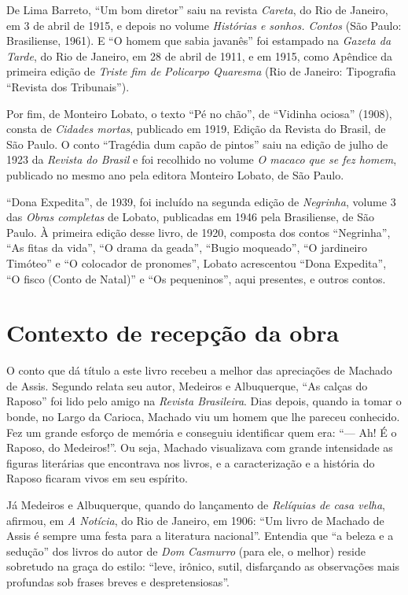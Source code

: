 De Lima Barreto, ``Um bom diretor'' saiu na revista \emph{Careta}, do
Rio de Janeiro, em 3 de abril de 1915, e depois no volume
\emph{Histórias e sonhos. Contos} (São Paulo: Brasiliense, 1961). E ``O
homem que sabia javanês'' foi estampado na \emph{Gazeta da Tarde}, do
Rio de Janeiro, em 28 de abril de 1911, e em 1915, como Apêndice da
primeira edição de \emph{Triste fim de} \emph{Policarpo Quaresma} (Rio
de Janeiro: Tipografia ``Revista dos Tribunais'').

Por fim, de Monteiro Lobato, o texto ``Pé no chão'', de ``Vidinha
ociosa'' (1908), consta de \emph{Cidades mortas}, publicado em 1919,
Edição da Revista do Brasil, de São Paulo. O conto ``Tragédia dum capão
de pintos'' saiu na edição de julho de 1923 da \emph{Revista do Brasil}
e foi recolhido no volume \emph{O macaco que se fez homem}, publicado no
mesmo ano pela editora Monteiro Lobato, de São Paulo.

``Dona Expedita'', de 1939, foi incluído na segunda edição de
\emph{Negrinha}, volume 3 das \emph{Obras completas} de Lobato,
publicadas em 1946 pela Brasiliense, de São Paulo. À primeira edição
desse livro, de 1920, composta dos contos ``Negrinha'', ``As fitas da
vida'', ``O drama da geada'', ``Bugio moqueado'', ``O jardineiro
Timóteo'' e ``O colocador de pronomes'', Lobato acrescentou ``Dona
Expedita'', ``O fisco (Conto de Natal)'' e ``Os pequeninos'', aqui
presentes, e outros contos.

\section{Contexto de recepção da obra}

O conto que dá título a este livro recebeu a melhor das apreciações de
Machado de Assis. Segundo relata seu autor, Medeiros e Albuquerque, ``As
calças do Raposo'' foi lido pelo amigo na \emph{Revista Brasileira}.
Dias depois, quando ia tomar o bonde, no Largo da Carioca, Machado viu
um homem que lhe pareceu conhecido. Fez um grande esforço de memória e
conseguiu identificar quem era: ``--- Ah! É o Raposo, do Medeiros!''. Ou
seja, Machado visualizava com grande intensidade as figuras literárias
que encontrava nos livros, e a caracterização e a história do Raposo
ficaram vivos em seu espírito.

Já Medeiros e Albuquerque, quando do lançamento de \emph{Relíquias de
casa velha}, afirmou, em \emph{A Notícia}, do Rio de Janeiro, em 1906:
``Um livro de Machado de Assis é sempre uma festa para a literatura
nacional''. Entendia que ``a beleza e a sedução'' dos livros do autor de
\emph{Dom} \emph{Casmurro} (para ele, o melhor) reside sobretudo na
graça do estilo: ``leve, irônico, sutil, disfarçando as observações mais
profundas sob frases breves e despretensiosas''.

